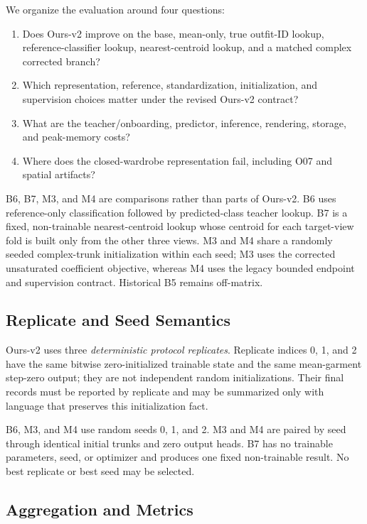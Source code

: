 We organize the evaluation around four questions:
\begin{enumerate}
  \item Does Ours-v2 improve on the base, mean-only, true outfit-ID lookup, reference-classifier lookup, nearest-centroid lookup, and a matched complex corrected branch?
  \item Which representation, reference, standardization, initialization, and supervision choices matter under the revised Ours-v2 contract?
  \item What are the teacher/onboarding, predictor, inference, rendering, storage, and peak-memory costs?
  \item Where does the closed-wardrobe representation fail, including O07 and spatial artifacts?
\end{enumerate}

B6, B7, M3, and M4 are comparisons rather than parts of Ours-v2. B6 uses reference-only classification followed by predicted-class teacher lookup. B7 is a fixed, non-trainable nearest-centroid lookup whose centroid for each target-view fold is built only from the other three views. M3 and M4 share a randomly seeded complex-trunk initialization within each seed; M3 uses the corrected unsaturated coefficient objective, whereas M4 uses the legacy bounded endpoint and supervision contract. Historical B5 remains off-matrix.

\subsection{Replicate and Seed Semantics}

Ours-v2 uses three \emph{deterministic protocol replicates}. Replicate indices 0, 1, and 2 have the same bitwise zero-initialized trainable state and the same mean-garment step-zero output; they are not independent random initializations. Their final records must be reported by replicate and may be summarized only with language that preserves this initialization fact.

B6, M3, and M4 use random seeds 0, 1, and 2. M3 and M4 are paired by seed through identical initial trunks and zero output heads. B7 has no trainable parameters, seed, or optimizer and produces one fixed non-trainable result. No best replicate or best seed may be selected.

\subsection{Aggregation and Metrics}

